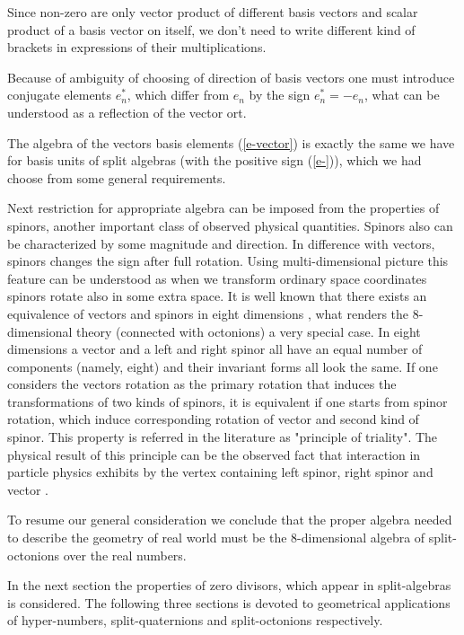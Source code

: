 \documentclass[a4paper,12pt]{article}
\begin{document}
Since non-zero are only vector product of different basis vectors and scalar product of 
a basis vector on itself, we don't need to write different kind of brackets in 
expressions of their multiplications. 

Because of ambiguity of choosing of direction of basis vectors one must introduce conjugate 
elements $e_n^*$, which differ from $e_n$ by the sign $e_n^* = - e_n$, what can be 
understood as a reflection of the vector ort. 

The algebra of the vectors basis elements (\ref{e-vector}) is exactly the same we have 
for basis units of split algebras (with the positive sign (\ref{e-})), which we had choose 
from some general requirements. 

Next restriction for appropriate algebra can be imposed from the properties of spinors, 
another important class of observed physical quantities. Spinors also can be characterized 
by some magnitude and direction. In difference with vectors, spinors changes the sign after 
full rotation. Using multi-dimensional picture this feature can be understood as when we 
transform ordinary space coordinates spinors rotate also in some extra space. It is well 
known that there exists an equivalence of vectors and spinors in eight dimensions 
\cite{CaGa}, what renders the 8-dimensional theory (connected with octonions) a very 
special case. In eight dimensions a vector and a left and right spinor all have an equal 
number of components (namely, eight) and their invariant forms all look the same. If one 
considers the vectors rotation as the primary rotation that induces the transformations 
of two kinds of spinors, it is equivalent if one starts from spinor rotation, which induce 
corresponding rotation of vector and second kind of spinor. This property is referred in 
the literature as "principle of triality". The physical result of this principle can be 
the observed fact that interaction in particle physics exhibits by the vertex containing 
left spinor, right spinor and vector \cite{Ba}. 

To resume our general consideration we conclude that the proper algebra needed to describe 
the geometry of real world must be the 8-dimensional algebra of split-octonions over the 
real numbers. 

In the next section the properties of zero divisors, which appear in split-algebras is 
considered. The following three sections is devoted to geometrical applications of 
hyper-numbers, split-quaternions and split-octonions respectively.
\end{document}
